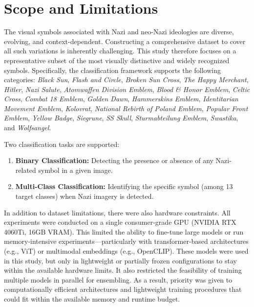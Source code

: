 \section{Scope and Limitations}

The visual symbols associated with Nazi and neo-Nazi ideologies are diverse, evolving, and context-dependent.
Constructing a comprehensive dataset to cover all such variations is inherently challenging. This study therefore
focuses on a representative subset of the most visually distinctive and widely recognized symbols. Specifically, the
classification framework supports the following categories: \textit{Black Sun}, \textit{Flash and Circle},
\textit{Broken Sun Cross}, \textit{The Happy Merchant}, \textit{Hitler}, \textit{Nazi Salute},
\textit{Atomwaffen Division Emblem}, \textit{Blood \& Honor Emblem}, \textit{Celtic Cross},
\textit{Combat 18 Emblem}, \textit{Golden Dawn}, \textit{Hammerskins Emblem},
\textit{Identitarian Movement Emblem}, \textit{Kolovrat}, \textit{National Rebirth of Poland Emblem},
\textit{Popular Front Emblem}, \textit{Yellow Badge}, \textit{Siegrune}, \textit{\ac{SS} Skull},
\textit{Sturmabteilung Emblem}, \textit{Swastika}, and \textit{Wolfsangel}.

Two classification tasks are supported:

\begin{enumerate}
\item \textbf{Binary Classification:} Detecting the presence or absence of any Nazi-related symbol in a given image.
\item \textbf{Multi-Class Classification:} Identifying the specific symbol (among 13 target classes) when Nazi
imagery is detected.
\end{enumerate}

In addition to dataset limitations, there were also hardware constraints. All experiments were conducted on a single
consumer-grade GPU (NVIDIA RTX 4060Ti, 16GB VRAM). This limited the ability to fine-tune large
models or run memory-intensive experiments—particularly with transformer-based architectures (e.g., \ac{ViT}) or
multimodal embeddings (e.g., OpenCLIP). These models were used in this study, but only in lightweight or partially
frozen configurations to stay within the available hardware limits. It also restricted the feasibility
of training multiple models in parallel for ensembling. As a result, priority was given to computationally efficient
architectures and lightweight training procedures that could fit within the available memory and runtime budget.

